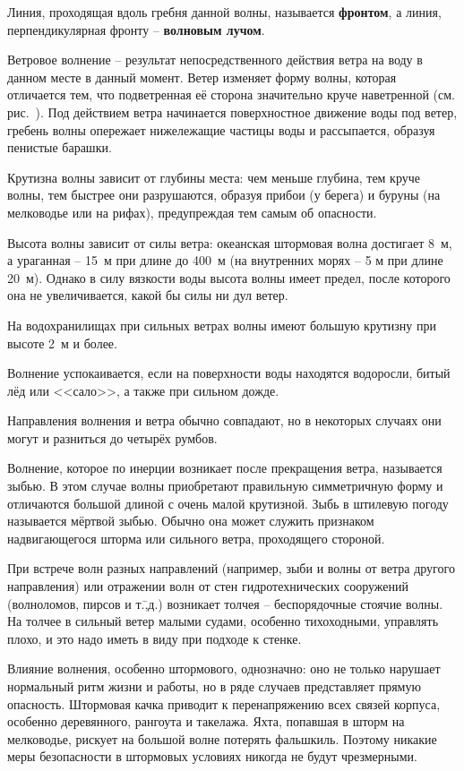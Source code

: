 Линия, проходящая вдоль гребня данной волны, называется
\textbf{фронтом}, а линия, перпендикулярная фронту \---
\textbf{волновым лучом}.

Ветровое волнение \--- результат непосредственного действия ветра на
воду в данном месте в данный момент. Ветер изменяет форму волны,
которая отличается тем, что подветренная её сторона значительно круче
наветренной (см. рис.~). Под действием ветра начинается
поверхностное движение воды под ветер, гребень волны опережает
нижележащие частицы воды и рассыпается, образуя пенистые барашки.

Крутизна волны зависит от глубины места: чем меньше глубина, тем круче
волны, тем быстрее они разрушаются, образуя прибои (у берега) и буруны
(на мелководье или на рифах), предупреждая тем самым об опасности.

Высота волны зависит от силы ветра: океанская штормовая волна
достигает 8~м, а ураганная \--- 15~м при длине до 400~м (на
внутренних морях \--- 5 м при длине 20~м). Однако в силу
вязкости воды высота волны имеет предел, после которого она не
увеличивается, какой бы силы ни дул ветер.

На водохранилищах при сильных ветрах волны имеют большую крутизну при
высоте 2~м и более.

Волнение успокаивается, если на поверхности воды находятся водоросли,
битый лёд или <<сало>>, а также при сильном дожде.

Направления волнения и ветра обычно совпадают, но в некоторых случаях
они могут и разниться до четырёх румбов.

Волнение, которое по инерции возникает после прекращения ветра,
называется зыбью. В этом случае волны приобретают правильную
симметричную форму и отличаются большой длиной с очень малой
крутизной. Зыбь в штилевую погоду называется мёртвой зыбью. Обычно она
может служить признаком надвигающегося шторма или сильного ветра,
проходящего стороной.

При встрече волн разных направлений (например, зыби и волны от ветра
другого направления) или отражении волн от стен гидротехнических
сооружений (волноломов, пирсов и т.\=,д.) возникает толчея \---
беспорядочные стоячие волны. На толчее в сильный ветер малыми судами,
особенно тихоходными, управлять плохо, и это надо иметь в виду при
подходе к стенке.

Влияние волнения, особенно штормового, однозначно: оно не только
нарушает нормальный ритм жизни и работы, но в ряде случаев
представляет прямую опасность. Штормовая качка приводит к
перенапряжению всех связей корпуса, особенно деревянного, рангоута и
такелажа. Яхта, попавшая в шторм на мелководье, рискует на большой
волне потерять фальшкиль. Поэтому никакие меры безопасности в
штормовых условиях никогда не будут чрезмерными.

